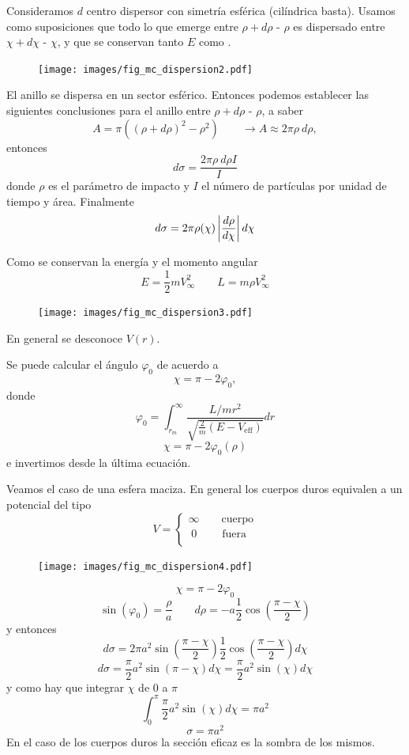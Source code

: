 \documentclass[10pt,oneside]{CBFT_book}
\begin{document}
Consideramos $d$ centro dispersor con simetría esférica (cilíndrica basta).
Usamos como suposiciones que todo lo que emerge entre $\rho + d\rho$ - $\rho$  es dispersado entre
$\chi + d\chi$ - $\chi$, y que se conservan tanto $E$ como .

\begin{figure}[htb]
	\begin{center}
	\texttt{[image: images/fig\_mc\_dispersion2.pdf]}	 
	\end{center}
	\caption{}
\end{figure}

El anillo se dispersa en un sector esférico. Entonces podemos establecer las siguientes conclusiones
para el anillo entre $\rho + d\rho$ - $\rho$, a saber
\[
	A =  \pi ( (\rho + d\rho)^2 - \rho^2 ) \qquad \longrightarrow A \approx 2 \pi \rho \: d\rho,
\]
entonces
\[
	d\sigma = \frac{  2 \pi \rho \: d\rho I}{I}
\]
donde $\rho$ es el parámetro de impacto y $I$ el número de partículas por unidad de tiempo y área.
Finalmente
\[
	d\sigma =  2 \pi \rho(\chi) \left| \frac{d^{\hspace{-0.05em}} {\rho}}{d {\chi}^{\hspace{-0.05em}}} \right| d\chi
\]

Como se conservan la energía y el momento angular
\[
	E = \frac{1}{2} m V_\infty^2 \qquad L = m \rho V_\infty^2 
\]
\begin{figure}[htb]
	\begin{center}
	\texttt{[image: images/fig\_mc\_dispersion3.pdf]}	 
	\end{center}
	\caption{}
\end{figure}
En general se desconoce $V(r)$.

Se puede calcular el ángulo $\varphi_0$ de acuerdo a 
\[
	\chi = \pi - 2\varphi_0,
\]
donde
\[
	\varphi_0 = \int_{r_m}^{\infty} \frac{L/mr^2}{\sqrt{\frac{2}{m}(E - V_{\text{eff}})}} dr
\]
\[
	\chi = \pi - 2 \varphi_0 (\rho)
\]
e invertimos desde la última ecuación.

Veamos el caso de una esfera maciza. En general los cuerpos duros equivalen a un potencial del tipo
\[
	V = \begin{cases}
	     \infty \qquad \textrm{cuerpo}\\
	     \;0 \qquad \; \textrm{fuera} \\
	    \end{cases}
\]
\begin{figure}[htb]
	\begin{center}
	\texttt{[image: images/fig\_mc\_dispersion4.pdf]}	 
	\end{center}
	\caption{}
\end{figure}
\[
	\chi = \pi - 2\varphi_0
\]
\[
	\sin(\varphi_0) = \frac{\rho}{a} \qquad d\rho = -a \frac{1}{2}\cos \left(\frac{\pi-\chi}{2}\right)
\]
y entonces 
\[
	d\sigma = 2\pi a^2 \sin\left(\frac{\pi-\chi}{2}\right) \frac{1}{2}\cos\left(\frac{\pi-\chi}{2}\right) d\chi
\]
\[
	d\sigma = \frac{\pi}{2} a^2 \sin( \pi-\chi) d\chi = \frac{\pi}{2} a^2 \sin( \chi) d\chi
\]
y como hay que integrar $\chi$ de 0 a $\pi$
\[
	\int_0^\pi \frac{\pi}{2} a^2 \sin( \chi) d\chi = \pi a^2
\]
\[
	\sigma = \pi a^2
\]
En el caso de los cuerpos duros la sección eficaz es la sombra de los mismos.
\end{document}
